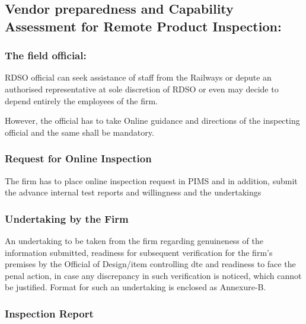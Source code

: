 \documentclass[
]{article}
\begin{document}
\hypertarget{vendor-preparedness-and-capability-assessment-for-remote-product-inspection}{%
\subsection{Vendor preparedness and Capability Assessment for Remote
Product
Inspection:}\label{vendor-preparedness-and-capability-assessment-for-remote-product-inspection}}

\hypertarget{the-field-official}{%
\subsubsection{The field official:}\label{the-field-official}}

RDSO official can seek assistance of staff from the Railways or depute
an authorised representative at sole discretion of RDSO or even may
decide to depend entirely the employees of the firm.

However, the official has to take Online guidance and directions of the
inspecting official and the same shall be mandatory.

\hypertarget{request-for-online-inspection}{%
\subsubsection{Request for Online
Inspection}\label{request-for-online-inspection}}

The firm has to place online inspection request in PIMS and in addition,
submit the advance internal test reports and willingness and the
undertakings

\hypertarget{undertaking-by-the-firm}{%
\subsubsection{Undertaking by the Firm}\label{undertaking-by-the-firm}}

An undertaking to be taken from the firm regarding genuineness of the
information submitted, readiness for subsequent verification for the
firm's premises by the Official of Design/item controlling dte and
readiness to face the penal action, in case any discrepancy in such
verification is noticed, which cannot be justified. Format for such an
undertaking is enclosed as Annexure-B.

\hypertarget{inspection-report}{%
\subsubsection{Inspection Report}\label{inspection-report}}
\end{document}
